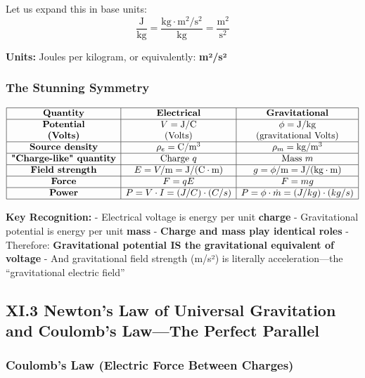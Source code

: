 \documentclass[
]{article}
\begin{document}
Let us expand this in base units:
\[\frac{\text{J}}{\text{kg}} = \frac{\text{kg} \cdot \text{m}^2/\text{s}^2}{\text{kg}} = \frac{\text{m}^2}{\text{s}^2}\]

\textbf{Units:} Joules per kilogram, or equivalently: \textbf{m²/s²}

\subsubsection{The Stunning Symmetry}\label{the-stunning-symmetry}

\[\begin{array}{|c|c|c|}
\hline
\textbf{Quantity} & \textbf{Electrical} & \textbf{Gravitational} \\
\hline
\textbf{Potential} & V = \text{J}/\text{C} & \phi = \text{J}/\text{kg} \\
\textbf{(Volts)} & \text{(Volts)} & \text{(gravitational Volts)} \\
\hline
\textbf{Source density} & \rho_e = \text{C}/\text{m}^3 & \rho_m = \text{kg}/\text{m}^3 \\
\hline
\textbf{"Charge-like" quantity} & \text{Charge } q & \text{Mass } m \\
\hline
\textbf{Field strength} & E = V/\text{m} = \text{J}/(\text{C} \cdot \text{m}) & g = \phi/\text{m} = \text{J}/(\text{kg} \cdot \text{m}) \\
\hline
\textbf{Force} & F = qE & F = mg \\
\hline
\textbf{Power} & P = V \cdot I = (J/C) \cdot (C/s) & P = \phi \cdot \dot{m} = (J/kg) \cdot (kg/s) \\
\hline
\end{array}\]

\textbf{Key Recognition:} - Electrical voltage is energy per unit
\textbf{charge} - Gravitational potential is energy per unit
\textbf{mass} - \textbf{Charge and mass play identical roles} -
Therefore: \textbf{Gravitational potential IS the gravitational
equivalent of voltage} - And gravitational field strength (m/s²) is
literally acceleration---the ``gravitational electric field''

\subsection{XI.3 Newton's Law of Universal Gravitation and Coulomb's
Law---The Perfect
Parallel}\label{xi.3-newtons-law-of-universal-gravitation-and-coulombs-lawthe-perfect-parallel}

\subsubsection{Coulomb's Law (Electric Force Between
Charges)}\label{coulombs-law-electric-force-between-charges}
\end{document}
